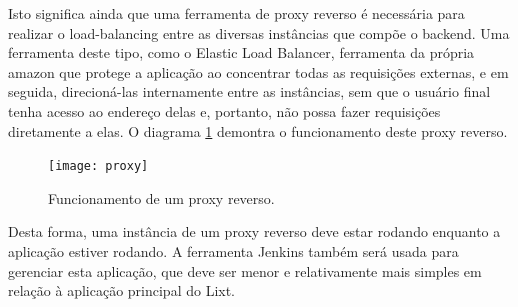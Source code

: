 Isto significa ainda que uma ferramenta de \gls{proxy} reverso é
necessária para realizar o \gls{load-balancing} entre as diversas
instâncias que compõe o \gls{backend}. Uma ferramenta deste tipo, como
o Elastic Load Balancer, ferramenta da própria amazon que protege a
aplicação ao concentrar todas as requisições externas, e em seguida,
direcioná-las internamente entre as instâncias, sem que o usuário
final tenha acesso ao endereço delas e, portanto, não possa fazer
requisições diretamente a elas.  O diagrama \ref{fig:proxy} demontra o
funcionamento deste proxy reverso.

\begin{figure}[!htb]
  \centering
  \caption{Funcionamento de um proxy reverso.}
  \label{fig:proxy}
  \texttt{[image: proxy]}
\end{figure}

Desta forma, uma instância de um proxy reverso deve estar rodando
enquanto a aplicação estiver rodando. A ferramenta Jenkins também será
usada para gerenciar esta aplicação, que deve ser menor e
relativamente mais simples em relação à aplicação principal do Lixt.


